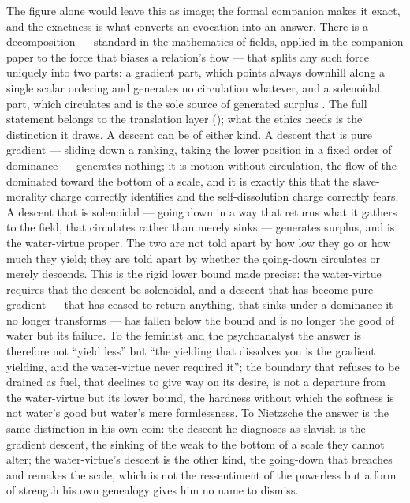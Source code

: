 The figure alone would leave this as image; the formal companion makes it exact, and the exactness is what converts an evocation into an answer. There is a decomposition --- standard in the mathematics of fields, applied in the companion paper to the force that biases a relation's flow --- that splits any such force uniquely into two parts: a gradient part, which points always downhill along a single scalar ordering and generates no circulation whatever, and a solenoidal part, which circulates and is the sole source of generated surplus \parencite{wan2026braid}. The full statement belongs to the translation layer (); what the ethics needs is the distinction it draws. A descent can be of either kind. A descent that is pure gradient --- sliding down a ranking, taking the lower position in a fixed order of dominance --- generates nothing; it is motion without circulation, the flow of the dominated toward the bottom of a scale, and it is exactly this that the slave-morality charge correctly identifies and the self-dissolution charge correctly fears. A descent that is solenoidal --- going down in a way that returns what it gathers to the field, that circulates rather than merely sinks --- generates surplus, and is the water-virtue proper. The two are not told apart by how low they go or how much they yield; they are told apart by whether the going-down circulates or merely descends. This is the rigid lower bound made precise: the water-virtue requires that the descent be solenoidal, and a descent that has become pure gradient --- that has ceased to return anything, that sinks under a dominance it no longer transforms --- has fallen below the bound and is no longer the good of water but its failure. To the feminist and the psychoanalyst the answer is therefore not ``yield less'' but ``the yielding that dissolves you is the gradient yielding, and the water-virtue never required it''; the boundary that refuses to be drained as fuel, that declines to give way on its desire, is not a departure from the water-virtue but its lower bound, the hardness without which the softness is not water's good but water's mere formlessness. To Nietzsche the answer is the same distinction in his own coin: the descent he diagnoses as slavish is the gradient descent, the sinking of the weak to the bottom of a scale they cannot alter; the water-virtue's descent is the other kind, the going-down that breaches and remakes the scale, which is not the ressentiment of the powerless but a form of strength his own genealogy gives him no name to dismiss.

